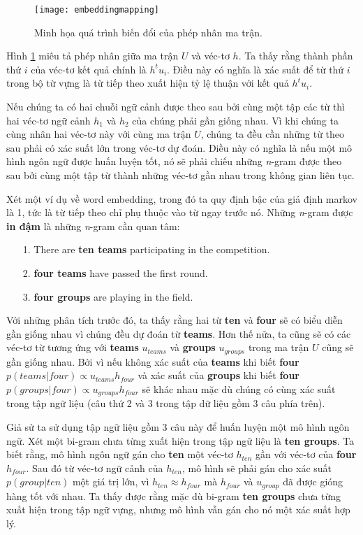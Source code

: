 \begin{figure}
	\centering
	\texttt{[image: embeddingmapping]}
	\caption[Minh họa quá trình biến đổi của phép nhân ma trận]{Minh họa quá trình biến đổi của phép nhân ma trận.}
	\label{fig_embedding_mapping}
\end{figure}

Hình \ref{fig_embedding_mapping} miêu tả phép nhân giữa ma trận $U$ và véc-tơ $h$. Ta thấy rằng thành phần thứ $i$ của véc-tơ kết quả chính là $h^tu_i$. Điều này có nghĩa là xác suất để từ thứ $i$ trong bộ từ vựng là từ tiếp theo xuất hiện tỷ lệ thuận với kết quả $h^tu_i$.

Nếu chúng ta có hai chuỗi ngữ cảnh được theo sau bởi cùng  một tập các từ thì hai véc-tơ ngữ cảnh $h_1$ và $h_2$ của chúng phải gần giống nhau. Vì khi chúng ta cùng nhân hai véc-tơ này với cùng ma trận $U$, chúng ta đều cần những từ theo sau phải có xác suất lớn trong véc-tơ dự đoán. Điều này có nghĩa là nếu một mô hình ngôn ngữ được huấn luyện tốt, nó sẽ phải chiếu những \textit{n}-gram được theo sau bởi cùng một tập từ thành những véc-tơ gần nhau trong không gian liên tục.

Xét một ví dụ về word embedding, trong đó ta quy định bậc của giả định markov là 1, tức là từ tiếp theo chỉ phụ thuộc vào từ ngay trước nó. Những \textit{n}-gram được \textbf{in đậm} là những \textit{n}-gram cần quan tâm:
\begin{itemize}
	\item[1.] There are \textbf{ten teams} participating in the competition.
	\item[2.] \textbf{four teams} have passed the first round.
	\item[3.] \textbf{four groups} are playing in the field.
\end{itemize}

Với những phân tích trước đó, ta thấy rằng hai từ \textbf{ten} và \textbf{four} sẽ có biểu diễn gần giống nhau vì chúng đều dự đoán từ \textbf{teams}. Hơn thế nữa, ta cũng sẽ có các véc-tơ từ tương ứng với \textbf{teams} $u_{teams}$ và \textbf{groups} $u_{groups}$ trong ma trận $U$ cũng sẽ gần giống nhau. Bởi vì nếu không xác suất của \textbf{teams} khi biết \textbf{four} $p(teams|four) \propto u_{teams}h_{four}$ và xác suất của \textbf{groups} khi biết \textbf{four} $p(groups|four) \propto u_{groups}h_{four}$ sẽ khác nhau mặc dù chúng có cùng xác suất trong tập ngữ liệu (câu thứ 2 và 3 trong tập dữ liệu gồm 3 câu phía trên).

Giả sử ta sử dụng tập ngữ liệu gồm 3 câu này để huấn luyện một mô hình ngôn ngữ. Xét một bi-gram chưa từng xuất hiện trong tập ngữ liệu là \textbf{ten groups}. Ta biết rằng, mô hình ngôn ngữ gán cho \textbf{ten} một véc-tơ $h_{ten}$ gần với véc-tơ của \textbf{four} $h_{four}$. Sau đó từ véc-tơ ngữ cảnh của $h_{ten}$, mô hình sẽ phải gán cho xác suất $p(group|ten)$ một giá trị lớn, vì $h_{ten} \approx h_{four}$ mà $h_{four}$ và $u_{group}$ đã được gióng hàng tốt với nhau. Ta thấy được rằng mặc dù bi-gram \textbf{ten groups} chưa từng xuất hiện trong tập ngữ vựng, nhưng mô hình vẫn gán cho nó một xác suất hợp lý. 

